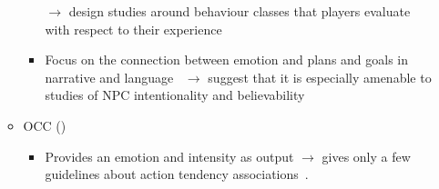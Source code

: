 \begin{itemize}
\begin{itemize}
\begin{itemize}
            \item [$\rightarrow$] design studies around behaviour classes that
            players evaluate with respect to their experience

            \item Focus on the connection between emotion and plans and goals
            in narrative and language~\citep[p.~70--71]{oatley1992best}
            $\rightarrow$ suggest that it is especially amenable to studies of
            NPC intentionality and believability
        \end{itemize}

        \item OCC (\weak)
        \begin{itemize}
            \item Provides an emotion and intensity as output $\rightarrow$
            gives only a few guidelines about action tendency
            associations~\citep[p.~197]{ortony2002making}.
        \end{itemize}
    \end{itemize}

\end{itemize}